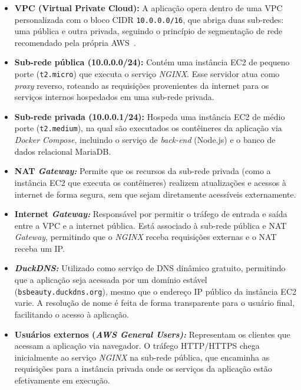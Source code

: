 \begin{itemize}
  \item \textbf{VPC (Virtual Private Cloud):} A aplicação opera dentro de uma VPC personalizada com o bloco CIDR \texttt{10.0.0.0/16}, que abriga duas sub-redes: uma pública e outra privada, seguindo o princípio de segmentação de rede recomendado pela própria AWS~\cite{AWSBestPractices}.

  \item \textbf{Sub-rede pública (10.0.0.0/24):} Contém uma instância EC2 de pequeno porte (\texttt{t2.micro}) que executa o serviço \emph{NGINX}. Esse servidor atua como \emph{proxy} reverso, roteando as requisições provenientes da internet para os serviços internos hospedados em uma sub-rede privada.

  \item \textbf{Sub-rede privada (10.0.0.1/24):} Hospeda uma instância EC2 de médio porte (\texttt{t2.medium}), na qual são executados os contêineres da aplicação via \emph{Docker Compose}, incluindo o serviço de \emph{back-end} (Node.js) e o banco de dados relacional MariaDB.

  \item \textbf{NAT \emph{Gateway:}} Permite que os recursos da sub-rede privada (como a instância EC2 que executa os contêineres) realizem atualizações e acessos à internet de forma segura, sem que sejam diretamente acessíveis externamente.

  \item \textbf{Internet \emph{Gateway:}} Responsável por permitir o tráfego de entrada e saída entre a VPC e a internet pública. Está associado à sub-rede pública e NAT \emph{Gateway}, permitindo que o \emph{NGINX} receba requisições externas e o NAT receba um IP.

  \item \textbf{\emph{DuckDNS:}} Utilizado como serviço de DNS dinâmico gratuito, permitindo que a aplicação seja acessada por um domínio estável (\texttt{bsbeauty.duckdns.org}), mesmo que o endereço IP público da instância EC2 varie. A resolução de nome é feita de forma transparente para o usuário final, facilitando o acesso à aplicação.

  \item \textbf{Usuários externos (\emph{AWS General Users):}} Representam os clientes que acessam a aplicação via navegador. O tráfego HTTP/HTTPS chega inicialmente ao serviço \emph{NGINX} na sub-rede pública, que encaminha as requisições para a instância privada onde os serviços da aplicação estão efetivamente em execução.
\end{itemize}


